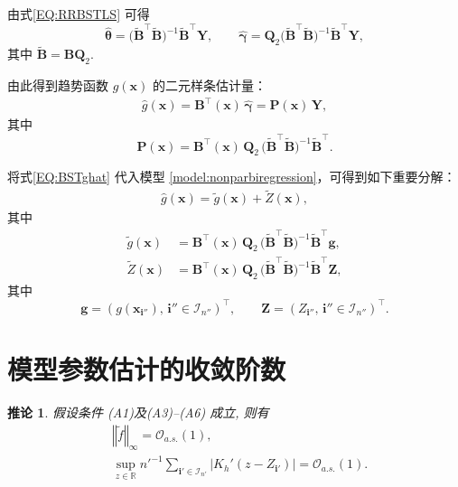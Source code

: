 \documentclass[a4paper,openay,14pt]{ctexbook}
\numberwithin{equation}{section}
\numberwithin{lem}{section}
\newtheorem{coro}[theorem]{推论}%
\begin{document}
由式\eqref{EQ:RRBSTLS} 可得
\[
\hat{\boldsymbol{\theta}}
= \bigl(\tilde{\mathbf{B}}^\top \tilde{\mathbf{B}}\bigr)^{-1}
  \tilde{\mathbf{B}}^\top \mathbf{Y},
\qquad
\hat{\boldsymbol{\gamma}}
= \mathbf{Q}_2
  \bigl(\tilde{\mathbf{B}}^\top \tilde{\mathbf{B}}\bigr)^{-1}
  \tilde{\mathbf{B}}^\top \mathbf{Y},
\]
其中 $\tilde{\mathbf{B}}=\mathbf{B}\mathbf{Q}_2$.

由此得到趋势函数 $g(\boldsymbol{x})$ 的二元样条估计量：
\begin{align}\label{EQ:BSTghat}
  \hat{g}(\boldsymbol{x})
  = \mathbf{B}^\top(\boldsymbol{x})\,\hat{\boldsymbol{\gamma}}
  = \mathbf{P}(\boldsymbol{x})\,\mathbf{Y},
\end{align}
其中
\[
\mathbf{P}(\boldsymbol{x})
= \mathbf{B}^\top(\boldsymbol{x})\,\mathbf{Q}_2\,
  \bigl(\tilde{\mathbf{B}}^\top \tilde{\mathbf{B}} \bigr)^{-1}
  \tilde{\mathbf{B}}^\top.
\]

将式\eqref{EQ:BSTghat} 代入模型 \eqref{model:nonparbiregression}，可得到如下重要分解：
\begin{align}\label{EQ:ghat}
  \hat{g}(\boldsymbol{x})
  = \tilde{g}(\boldsymbol{x}) + \tilde{Z}(\boldsymbol{x}),
\end{align}
其中
\begin{align}\label{gtilde}
  \tilde{g}(\boldsymbol{x})
  &= \mathbf{B}^\top(\boldsymbol{x})\,\mathbf{Q}_2\,
     \bigl(\tilde{\mathbf{B}}^\top \tilde{\mathbf{B}}\bigr)^{-1}
     \tilde{\mathbf{B}}^\top \mathbf{g},\\[0.4em]
\label{Ztilde}
  \tilde{Z}(\boldsymbol{x})
  &= \mathbf{B}^\top(\boldsymbol{x})\,\mathbf{Q}_2\,
     \bigl(\tilde{\mathbf{B}}^\top \tilde{\mathbf{B}} \bigr)^{-1}
     \tilde{\mathbf{B}}^\top \mathbf{Z},
\end{align}
其中
\[
\mathbf{g}
=(g(\boldsymbol{x}_{\mathbf{i}''}),\,\mathbf{i}''\in \mathcal{I}_{n''})^{\top},
\qquad
\mathbf{Z}
=(Z_{\mathbf{i}''},\,\mathbf{i}''\in \mathcal{I}_{n''})^{\top}.
\]



\section{模型参数估计的收敛阶数}

\begin{coro}\label{colrollary:ftilde}
假设条件 (A1)及(A3)–(A6) 成立, 则有
\begin{align*}
    &\left\Vert \tilde{f} \right\Vert_{\infty} = \mathcal{O}_{a.s.}(1),
    \\ 
    &\sup_{z\in\mathbb{R}} n'^{-1}\sum_{\mathbf{i}'\in\mathcal{I}_{n'}} 
    \left\vert K_h'(z-Z_{\mathbf{i}'}) \right\vert = \mathcal{O}_{a.s.}(1).
\end{align*}
\end{coro}
\end{document}
